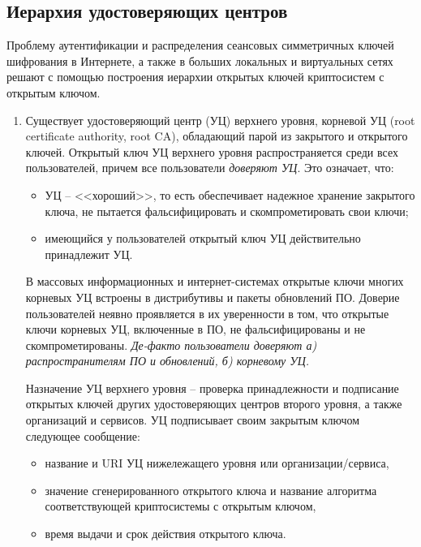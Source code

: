 \subsection{Иерархия удостоверяющих центров}\label{section-CAs}

Проблему аутентификации и распределения сеансовых симметричных ключей шифрования в Интернете, а также в больших локальных и виртуальных сетях решают с помощью построения иерархии открытых ключей криптосистем с открытым ключом.

\begin{enumerate}
    \item Существует удостоверяющий центр (УЦ) верхнего уровня, корневой УЦ (root certificate authority, root CA), обладающий парой из закрытого и открытого ключей. Открытый ключ УЦ верхнего уровня распространяется среди всех пользователей, причем все пользователи \emph{доверяют УЦ}. Это означает, что:
        \begin{itemize}
            \item УЦ -- <<хороший>>, то есть обеспечивает надежное хранение закрытого ключа, не пытается фальсифицировать и скомпрометировать свои ключи;
            \item имеющийся у пользователей открытый ключ УЦ действительно принадлежит УЦ.
        \end{itemize}
        В массовых информационных и интернет-системах открытые ключи многих корневых УЦ встроены в дистрибутивы и пакеты обновлений ПО. Доверие пользователей неявно проявляется в их уверенности в том, что открытые ключи корневых УЦ, включенные в ПО, не фальсифицированы и не скомпрометированы. \emph{Де-факто пользователи доверяют а) распространителям ПО и обновлений, б) корневому УЦ.}

        Назначение УЦ верхнего уровня -- проверка принадлежности и подписание открытых ключей других удостоверяющих центров второго уровня, а также организаций и сервисов. УЦ подписывает своим закрытым ключом следующее сообщение:
        \begin{itemize}
            \item название и URI УЦ нижележащего уровня или организации/сервиса,
            \item значение сгенерированного открытого ключа и название алгоритма соответствующей криптосистемы с открытым ключом,
            \item время выдачи и срок действия открытого ключа.
        \end{itemize}


\end{enumerate}
